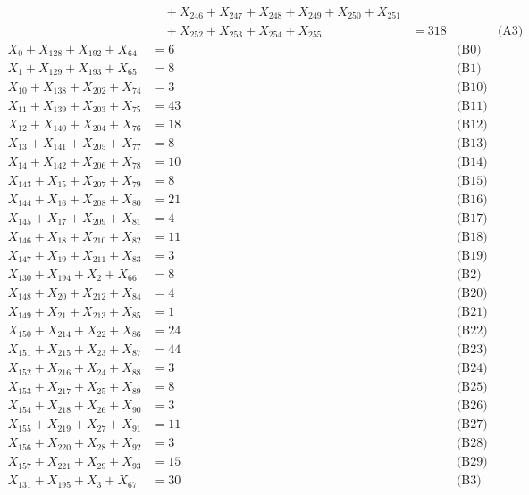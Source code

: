 \documentclass[a4paper,10pt]{article}
\begin{document}
{\begin{align}
&\quad  + X_{246} + X_{247} + X_{248} + X_{249} + X_{250} + X_{251} \\[0.5ex]
&\quad  + X_{252} + X_{253} + X_{254} + X_{255} &= 318 && \text{(A3)} \\
X_{0} + X_{128} + X_{192} + X_{64} &= 6 && \text{(B0)} \\
X_{1} + X_{129} + X_{193} + X_{65} &= 8 && \text{(B1)} \\
X_{10} + X_{138} + X_{202} + X_{74} &= 3 && \text{(B10)} \\
X_{11} + X_{139} + X_{203} + X_{75} &= 43 && \text{(B11)} \\
X_{12} + X_{140} + X_{204} + X_{76} &= 18 && \text{(B12)} \\
X_{13} + X_{141} + X_{205} + X_{77} &= 8 && \text{(B13)} \\
X_{14} + X_{142} + X_{206} + X_{78} &= 10 && \text{(B14)} \\
X_{143} + X_{15} + X_{207} + X_{79} &= 8 && \text{(B15)} \\
X_{144} + X_{16} + X_{208} + X_{80} &= 21 && \text{(B16)} \\
X_{145} + X_{17} + X_{209} + X_{81} &= 4 && \text{(B17)} \\
X_{146} + X_{18} + X_{210} + X_{82} &= 11 && \text{(B18)} \\
X_{147} + X_{19} + X_{211} + X_{83} &= 3 && \text{(B19)} \\
X_{130} + X_{194} + X_{2} + X_{66} &= 8 && \text{(B2)} \\
X_{148} + X_{20} + X_{212} + X_{84} &= 4 && \text{(B20)} \\
X_{149} + X_{21} + X_{213} + X_{85} &= 1 && \text{(B21)} \\
X_{150} + X_{214} + X_{22} + X_{86} &= 24 && \text{(B22)} \\
\allowbreak
X_{151} + X_{215} + X_{23} + X_{87} &= 44 && \text{(B23)} \\
X_{152} + X_{216} + X_{24} + X_{88} &= 3 && \text{(B24)} \\
X_{153} + X_{217} + X_{25} + X_{89} &= 8 && \text{(B25)} \\
X_{154} + X_{218} + X_{26} + X_{90} &= 3 && \text{(B26)} \\
X_{155} + X_{219} + X_{27} + X_{91} &= 11 && \text{(B27)} \\
X_{156} + X_{220} + X_{28} + X_{92} &= 3 && \text{(B28)} \\
X_{157} + X_{221} + X_{29} + X_{93} &= 15 && \text{(B29)} \\
X_{131} + X_{195} + X_{3} + X_{67} &= 30 && \text{(B3)} \\

\end{align}}
\end{document}
